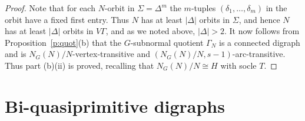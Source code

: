 \documentclass[11pt]{amsart}
\newcommand{\Ker}{\mathrm{Ker}}
\newcommand{\Sym}{\mathrm{Sym}}
\begin{document}
\begin{proof}
Note that for each $N$-orbit in $\Sigma=\Delta^m$ the  $m$-tuples $(\delta_1,\dots,\delta_m)$ in the orbit have a fixed first entry. Thus $N$ has at least $|\Delta|$ orbits in $\Sigma$, and hence $N$ has at least $|\Delta|$ orbits in $V\Gamma$, and as we noted above, $|\Delta|>2$. It now follows from Proposition~\ref{p:quot}(b) that the $G$-subnormal quotient $\Gamma_N$ is a connected digraph and is $N_G(N)/N$-vertex-transitive and  $(N_G(N)/N,s-1)$-arc-transitive. Thus part (b)(ii) is proved, recalling that $N_G(N)/N\cong H$ with socle $T$.
\end{proof}




\section{Bi-quasiprimitive digraphs}\label{section:biquasi}
\end{document}
